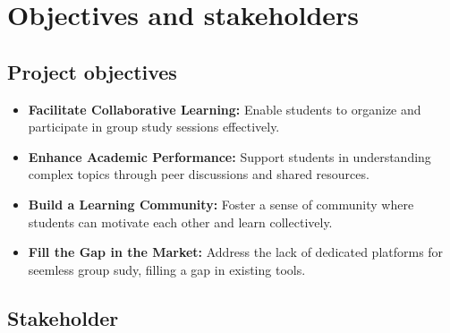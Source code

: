 \chapter{Objectives and stakeholders}

\section{Project objectives}
\label{sect:objectives}

\begin{itemize}
    \item \textbf{Facilitate Collaborative Learning:} Enable students to organize and participate in group study sessions effectively.
    \item \textbf{Enhance Academic Performance:} Support students in understanding complex topics through peer discussions and shared resources.
    \item \textbf{Build a Learning Community:} Foster a sense of community where students can motivate each other and learn collectively.
    \item \textbf{Fill the Gap in the Market:} Address the lack of dedicated platforms for seemless group sudy, filling a gap in existing tools.
\end{itemize}

\section{Stakeholder}
\label{sect:stakeholder}

